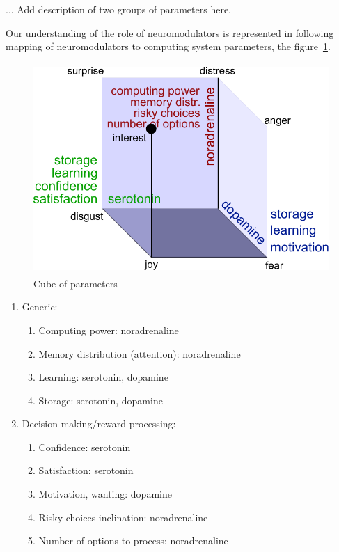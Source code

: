 ... Add description of two groups of parameters here.

Our understanding of the role of neuromodulators  is represented in following mapping of neuromodulators to computing system parameters, the figure~\ref{cube_of_parameters}.

\begin{figure}
\begin{center}
 \includegraphics[height=8cm]{figure3_cube_of_parameters}
\end{center}
\caption{Cube of parameters}
\label{cube_of_parameters}
\end{figure}

\begin{enumerate}
 \item  Generic:
 \begin{enumerate}
  \item  Computing power: noradrenaline
  \item  Memory distribution (attention): noradrenaline
  \item  Learning: serotonin, dopamine
  \item  Storage: serotonin, dopamine
 \end{enumerate}
 \item  Decision making/reward processing:
 \begin{enumerate}
  \item  Confidence: serotonin
  \item  Satisfaction: serotonin
  \item  Motivation, wanting: dopamine
  \item  Risky choices inclination: noradrenaline
  \item  Number of options to process: noradrenaline
 \end{enumerate}
\end{enumerate}

